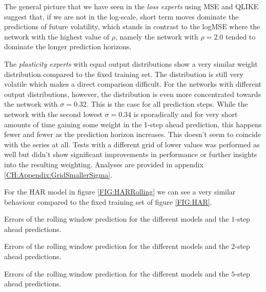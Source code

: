 The general picture that we have seen in the \textit{loss experts} using MSE and QLIKE suggest that, if we are not in the log-scale, short term moves dominate the predictions of future volatility, which stands in contrast to the logMSE where the network with the highest value of $\rho$, namely the network with $\rho = 2.0$ tended to dominate the longer prediction horizons.


The \textit{plasticity experts} with equal output distributions show a very similar weight distribution compared to the fixed training set. The distribution is still very volatile which makes a direct comparison difficult. 
For the networks with different output distributions, however, the distribution is even more concentrated towards the network with $\sigma = 0.32$. This is the case for all prediction steps. While the network with the second lowest $\sigma = 0.34$ is sporadically and for very short amounts of time gaining some weight in the 1-step ahead prediction, this happens fewer and fewer as the prediction horizon increases. This doesn't seem to coincide with the series at all.
Tests with a different grid of lower values was performed as well but didn't show significant improvements in performance or further insights into the resulting weighting. Analyses are provided in appendix \ref{CH:Appendix:GridSmallerSigma}.

For the HAR model in figure \ref{FIG:HARRolling} we can see a very similar behaviour compared to the fixed training set of figure \ref{FIG:HAR}.




\begin{table}
    \begin{center}
        
    \end{center}
    \caption{Errors of the rolling window prediction for the different models and the $1$-step ahead predictions.}
    \label{TABLE:1stepRolling}
\end{table} 

\begin{table}
    \begin{center}
        
    \end{center}
    \caption{Errors of the rolling window prediction for the different models and the $2$-step ahead predictions.}
    \label{TABLE:2stepRolling}
\end{table}

\begin{table}
    \begin{center}
        
    \end{center}
    \caption{Errors of the rolling window prediction for the different models and the $5$-step ahead predictions.}
    \label{TABLE:5stepRolling}
\end{table}

